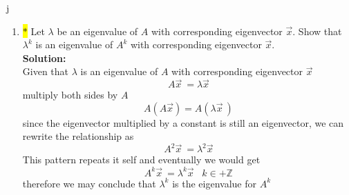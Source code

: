 j\documentclass[12pt]{article}
\begin{document}
\begin{enumerate}
\item \colorbox{yellow}{$\ast$} Let $\lambda$ be an eigenvalue of $A$ with corresponding eigenvector $\vec{x}$.  Show that $\lambda^{k}$ is an eigenvalue of $A^{k}$ with corresponding eigenvector $\vec{x}$.  
\\
\textbf{Solution:}\\
Given that $\lambda$ is an eigenvalue of $A$ with corresponding eigenvector $\vec x$
\[
A\vec x\ = \lambda \vec x
\]
multiply both sides by $A$
\[
A(A\Vec{x})=A(\lambda\vec x\ )
\]
since the eigenvector multiplied by a constant is still an eigenvector, we can rewrite the relationship as
\[
A^2\vec x\ = \lambda^2 \vec x
\]
This pattern repeats it self and eventually we would get 
\[
A^k \vec x \ =\lambda^k \vec{x} \;\;\; k\in +\mathbb{Z}
\]
therefore we may conclude that $\lambda^k$ is the eigenvalue for $A^k$






\end{enumerate}
\end{document}
